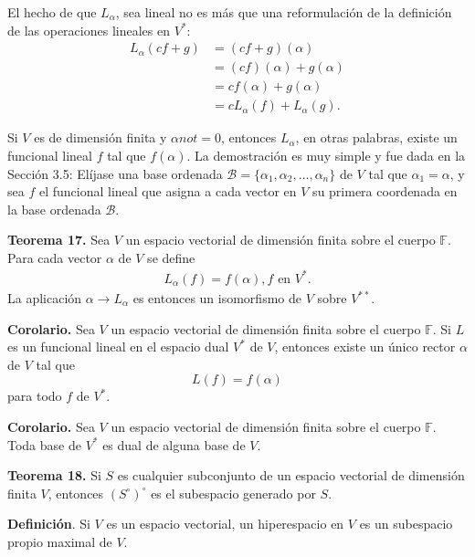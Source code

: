 \newpage
El hecho de que $L_{\alpha}$, sea lineal no es más que una reformulación
de la deﬁnición de las operaciones lineales en $V^{\ast}$:
\begin{align*}
    L_{\alpha}(cf + g) &= (cf + g)(\alpha)\\
    &= (cf)(\alpha) + g(\alpha)\\
    &= cf(\alpha) + g(\alpha)\\
    &= cL_{\alpha}(f) + L_{\alpha}(g).
\end{align*}

Si $V$ es de dimensión ﬁnita y $\alpha not = 0$, entonces $L_{\alpha}$,
en otras palabras, existe un funcional lineal $f$ tal que $f(\alpha)$.
La demostración es muy simple y fue dada en la Sección 3.5:
Elíjase una base ordenada $\mathcal{B}=\{\alpha_{1}, \alpha_{2},
\dots, \alpha_{n}\}$ de $V$ tal que $\alpha_{1}=\alpha$,
y sea $f$ el funcional lineal que asigna a cada vector en $V$
su primera coordenada en la base ordenada $\mathcal{B}$.

\textbf{Teorema 17.} Sea $V$ un espacio vectorial de dimensión
finita sobre el cuerpo $\mathbb{F}$. Para cada vector $\alpha$ de $V$ se define
\begin{align*}
    L_{\alpha}(f)=f(\alpha),  f \text{ en }V^{\ast}.
\end{align*}
La aplicación $\alpha \to L_{\alpha}$ es entonces un isomorfismo de $V$
sobre $V^{\ast\ast}$.

\textbf{Corolario.} Sea $V$ un espacio vectorial de dimensión finita sobre
el cuerpo $\mathbb{F}$. Si $L$ es un funcional lineal en el espacio dual
$V^{\ast}$ de $V$, entonces existe un único rector $\alpha$ de $V$ tal que
$$L(f) = f(\alpha)$$
para  todo $f$ de $V^{\ast}$.

\textbf{Corolario.} Sea $V$ un espacio vectorial de dimensión
finita sobre el cuerpo $\mathbb{F}$. Toda base de $V^{\ast}$
es dual de alguna base de $V$.

\textbf{Teorema 18.} Si $S$ es cualquier subconjunto de un espacio
vectorial de dimensión finita $V$, entonces $(S^{\circ})^{\circ}$
es el subespacio generado por $S$.

\textbf{Definición}. Si $V$ es un espacio vectorial, un hiperespacio
en $V$ es un subespacio propio maximal de $V$.

